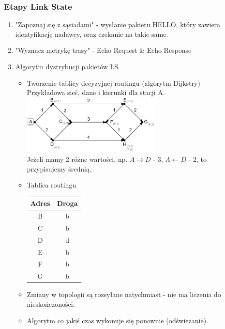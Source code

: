 			\subsubsection{Etapy Link State}
				\begin{enumerate}
					\item "Zapoznaj się z sąsiadami" - wysłanie pakietu HELLO, który zawiera identyfikację nadawcy, oraz czekanie na takie same.
					\item "Wyznacz metrykę trasy" - Echo Request \& Echo Response
					\item Algorytm dystrybucji pakietów LS
					\begin{itemize}
						\item Tworzenie tablicy decyzyjnej routingu (algorytm Dijkstry)\\
						Przykładowa sieć, dane i kierunki dla stacji A.\\
						\includegraphics[width=7.0cm]{./images/image45.pdf}\\
						Jeżeli mamy 2 różne wartości, np. $ A\rightarrow D$ - 3, $ A\leftarrow D$ - 2, to przypisujemy średnią.
						\item Tablica routingu\\
						\begin{tabular}{|c|c|}
							\hline
							\multicolumn{1}{|c|}{\textbf{Adres}}           & \textbf{Droga}      \\ \hline
							\multicolumn{1}{|c|}{B}               & b          \\ \hline
							\multicolumn{1}{|c|}{C}               & b          \\ \hline
							\multicolumn{1}{|c|}{D}               & d          \\ \hline
							\multicolumn{1}{|c|}{E}               & b          \\ \hline
							\multicolumn{1}{|c|}{F}               & b          \\ \hline
							\multicolumn{1}{|c|}{G}               & b          \\ \hline
						\end{tabular}
						\item Zmiany w topologii są rozsyłane natychmiast - nie ma liczenia do nieskończoności.
						\item Algorytm co jakiś czas wykonuje się ponownie (odświeżanie).
					\end{itemize}
				\end{enumerate}
